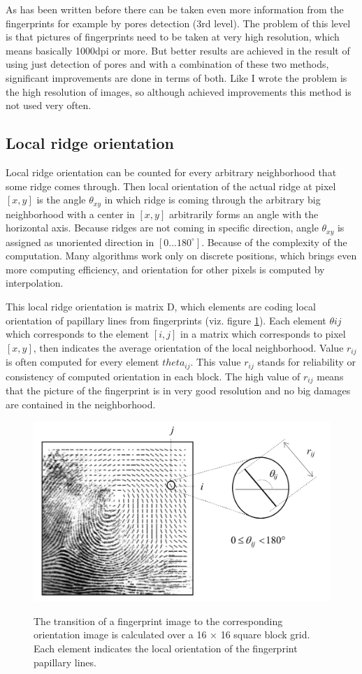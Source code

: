 As has been written before there can be taken even more information from the fingerprints for example by pores detection (3rd level). The problem of this level is that pictures of fingerprints need to be taken at very high resolution, which means basically 1000dpi or more. But better results are achieved in the result of using just detection of pores and with a combination of these two methods, significant improvements are done in terms of both. Like I wrote the problem is the high resolution of images, so although achieved improvements this method is not used very often.\cite{jain2007handbook} \cite{maltoni2009handbook}

\subsection{Local ridge orientation}

Local ridge orientation can be counted for every arbitrary neighborhood that some ridge comes through. Then local orientation of the actual ridge at pixel $[x,y]$ is the angle $\theta_{xy}$ in which ridge is coming through the arbitrary big neighborhood with a center in $[x,y]$ arbitrarily forms an angle with the horizontal axis. Because ridges are not coming in specific direction, angle $\theta_{xy}$ is assigned as unoriented direction in $\left[0 ... 180^{\circ}\right]$. Because of the complexity of the computation. Many algorithms work only on discrete positions, which brings even more computing efficiency, and orientation for other pixels is computed by interpolation.

This local ridge orientation is matrix D, which elements are coding local orientation of papillary lines from fingerprints (viz. figure \ref{fig:ori}). Each element $\theta{ij}$  which corresponds to the element $[i,j]$ in a matrix which corresponds to pixel $[x, y]$, then indicates the average orientation of the local neighborhood. Value $r_{ij}$ is often computed for every element $theta_{ij}$. This value $r_{ij}$ stands for reliability or consistency of computed orientation in each block. The high value of $r_{ij}$ means that the picture of the fingerprint is in very good resolution and no big damages are contained in the neighborhood.\cite{maltoni2009handbook}

\begin{figure}[H]
    \centering
        {\includegraphics[width=0.6\linewidth]{obrazky-figures/ori.png}}\\
        \caption{The transition of a fingerprint image to the corresponding orientation image is calculated over a 16 × 16 square block grid. Each element indicates the local orientation of the fingerprint papillary lines. \cite{maltoni2009handbook}}
        \label{fig:ori}
\end{figure}

